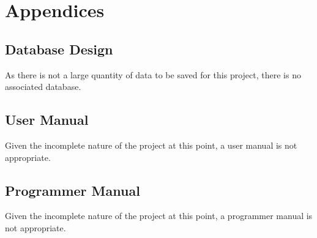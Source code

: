 \documentclass{article}
\begin{document}
\newpage

\section{Appendices}
\subsection{Database Design}
As there is not a large quantity of data to be saved for this project, there is no associated 
database.

\subsection{User Manual}
Given the incomplete nature of the project at this point, a user manual is not appropriate.

\subsection{Programmer Manual}
Given the incomplete nature of the project at this point, a programmer manual is not appropriate.

\newpage





\end{document}
